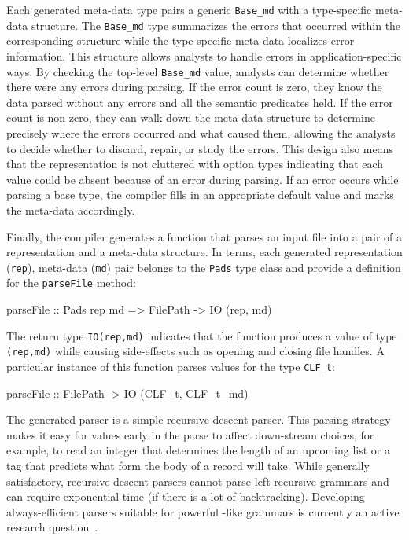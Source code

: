 \documentclass{sig-alternate}
\begin{document}
Each generated meta-data type pairs a generic \texttt{Base\_md} with a
type-specific meta-data structure.  The \texttt{Base\_md} type
summarizes the errors that occurred within the corresponding
structure while the type-specific meta-data localizes error
information.  This structure allows analysts to handle errors in
application-specific ways.  By checking the top-level
\texttt{Base\_md} value, analysts can determine whether there were
any errors during parsing. If the error count is zero, they know 
the data parsed without any errors and all the semantic predicates
held.  If the error count is non-zero, they can walk down the
meta-data structure to determine precisely where the errors occurred
and what caused them, allowing the analysts to decide whether to discard,
repair, or study the errors. This design also means that the
representation is not cluttered with option types indicating that each
value could be absent because of an error during parsing.  If an error
occurs while parsing a base type, the compiler fills in an appropriate
default value and marks the meta-data accordingly.


Finally, the compiler generates a function that parses
an input file into a pair of a representation and a meta-data
structure.  In \haskell{} terms, each generated representation (\texttt{rep}),
meta-data (\texttt{md}) pair belongs to the \texttt{Pads} type class and provide
a definition for the \texttt{parseFile} method:
\begin{code}
parseFile :: Pads rep md => 
             FilePath -> IO (rep, md)
\end{code}
The return type \texttt{IO(rep,md)} indicates that the function
produces a value of type \texttt{(rep,md)} while causing side-effects
such as opening and closing file handles.  A particular instance of
this function parses values for the type \texttt{CLF\_t}:
\begin{code}
parseFile :: FilePath -> IO (CLF_t, CLF_t_md)
\end{code}
The generated parser is a simple recursive-descent parser.  This
parsing strategy makes it easy for values early in the parse to affect
down-stream choices, for example, to read an integer that determines
the length of an upcoming list or a tag that predicts what form the
body of a record will take.  While generally satisfactory, recursive
descent parsers cannot parse left-recursive grammars and
can require exponential time (if there is a lot of
backtracking).  Developing always-efficient parsers suitable for
powerful \pads{}-like grammars is currently an active research question~\cite{Jim+:yakker}.
\end{document}

